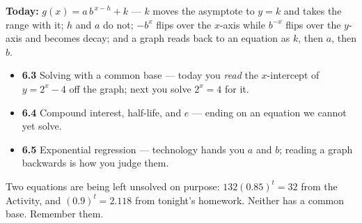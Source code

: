 \documentclass[aspectratio=169, 11pt]{beamer}
\begin{document}
\begin{frame}[t, plain]
  \textbf{Today:} $g(x)=a\,b^{\,x-h}+k$ --- $k$ moves the asymptote to $y=k$ and takes the range with
  it; $h$ and $a$ do not; $-b^{x}$ flips over the $x$-axis while $b^{-x}$ flips over the $y$-axis and
  becomes decay; and a graph reads back to an equation as $k$, then $a$, then $b$.\\[8pt]
  \begin{itemize}\setlength{\itemsep}{3pt}
    \item \textbf{6.3} Solving with a common base --- today you \emph{read} the $x$-intercept of $y=2^{x}-4$ off the graph; next you solve $2^{x}=4$ for it.
    \item \textbf{6.4} Compound interest, half-life, and $e$ --- ending on an equation we cannot yet solve.
    \item \textbf{6.5} Exponential regression --- technology hands you $a$ and $b$; reading a graph backwards is how you judge them.
  \end{itemize}
  \vspace{6pt}
  \begin{center}
    {\footnotesize Two equations are being left unsolved on purpose: $132(0.85)^{t}=32$ from the
    Activity, and $(0.9)^{t}=2.118$ from tonight's homework. Neither has a common base. Remember them.}
  \end{center}
\end{frame}
\end{document}
